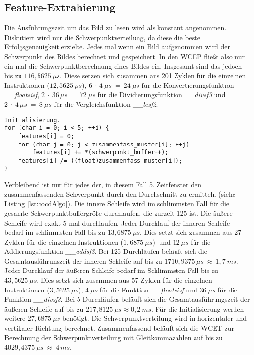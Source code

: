 \subsection{Feature-Extrahierung}
Die Ausführungszeit um das Bild zu lesen wird als konstant angenommen. Diskutiert wird nur die Schwerpunktverteilung, da diese die beste Erfolgsgenauigkeit erzielte.
\newline
\newline
Jedes mal wenn ein Bild
aufgenommen wird der Schwerpunkt des Bildes berechnet und gespeichert. In den WCEP fließt also nur ein mal die Schwerpunktberechnung eines Bildes ein. Insgesamt sind das jedoch bis zu $116,5625\ \mu s$.
Diese setzen sich zusammen aus 201 Zyklen für die einzelnen Instruktionen ($12,5625\ \mu s$), $6\ \cdot\ 4\ \mu s\ =\ 24\ \mu s$ für die Konvertierungsfunktion
\textit{\_\_floatsisf}, $2\ \cdot\ 36\ \mu s\ =\ 72\ \mu s$ für die Dividierungsfunktion \textit{\_\_divsf3} und $2\ \cdot\ 4\ \mu s\ =\ 8\ \mu s$ für die Vergleichsfunktion \textit{\_\_lesf2}.
\begin{lstlisting}[label=lst:cocdAlgo,caption={Algorithmus um die Schwerpunktverteilung zu berechnen.}]
Initialisierung.
for (char i = 0; i < 5; ++i) {
    features[i] = 0;
    for (char j = 0; j < zusammenfass_muster[i]; ++j)
        features[i] += *(schwerpunkt_buffer++);
    features[i] /= ((float)zusammenfass_muster[i]);
}
\end{lstlisting}
Verbleibend ist nur für jedes der, in diesem Fall 5, Zeitfenster den zusammenfassenden Schwerpunkt durch den Durchschnitt zu ermitteln (siehe Listing \ref{lst:cocdAlgo}). Die innere Schleife wird im
schlimmsten Fall für die gesamte Schwerpunktbuffergröße durchlaufen, die zurzeit 125 ist. Die äußere Schleife wird exakt 5 mal durchlaufen.
\newline
\newline
Jeder Durchlauf der inneren Schleife bedarf im schlimmsten Fall bis zu $13,6875\ \mu s$. Dies setzt sich zusammen aus 27 Zyklen für die einzelnen Instruktionen ($1,6875\ \mu s$),
und $12\ \mu s$ für die Addierungsfunktion \textit{\_\_addsf3}. Bei 125 Durchläufen beläuft sich die Gesamtausführunszeit der inneren Schleife auf bis zu $1710,9375\ \mu s\ \approx\ 1,7\ ms$.
\newline
\newline
Jeder Durchlauf der äußeren Schleife bedarf im Schlimmsten Fall bis zu $43,5625\ \mu s$. Dies setzt sich zusammen aus 57 Zyklen für die einzelnen Instruktionen ($3,5625\ \mu s$),
$4\ \mu s$ für die Funktion \textit{\_\_floatsisf} und $36\ \mu s$ für die Funktion \textit{\_\_divsf3}. Bei 5 Durchläufen beläuft sich die Gesamtausführungszeit
der äußeren Schleife auf bis zu $217,8125\ \mu s \approx 0,2\ ms$.
\newline
\newline
Für die Initialisierung werden weitere $27,6875\ \mu s$ benötigt. Die Schwerpunktverteilung wird in horizontaler und vertikaler Richtung berechnet. Zusammenfassend beläuft sich die WCET zur Berechnung der
Schwerpunktverteilung mit Gleitkommazahlen auf bis zu $4029,4375\ \mu s\ \approx\ 4\ ms$.
